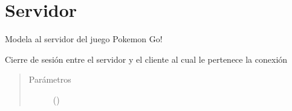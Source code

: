 \documentclass[letterpaper,10pt,spanish,openany,oneside]{sphinxmanual}
\begin{document}
\section{Servidor}
\label{\detokenize{server:servidor}}\label{\detokenize{server::doc}}
Modela al servidor del juego Pokemon Go!

\label{\detokenize{server:module-server}}

\begin{fulllineitems}
\label{\detokenize{server:server.cerrarSesion}}
Cierre de sesión entre el servidor y el cliente al cual le pertenece la conexión
\begin{quote}\begin{description}
\item[{Parámetros}] \leavevmode
{} () \textendash{} 

\end{description}\end{quote}

\end{fulllineitems}

\end{document}
